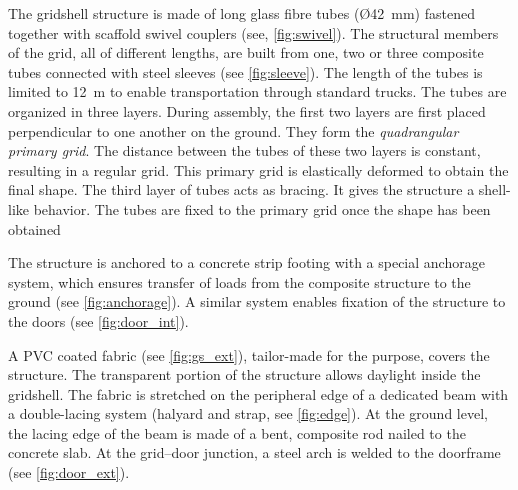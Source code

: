 The gridshell structure is made of long glass fibre tubes (\O 42~mm) fastened together with scaffold swivel couplers (see, \cref{fig:swivel}). The structural members of the grid, all of different lengths, are built  from one, two or three composite tubes connected with steel sleeves (see \cref{fig:sleeve}). The length of the tubes is limited to 12~m to enable transportation through standard trucks. The tubes are organized in three layers. During assembly, the first two layers are first placed perpendicular to one another on the ground. They form the \emph{quadrangular primary grid}. The distance between the tubes of these two layers is constant, resulting in a regular grid. This primary grid is elastically deformed to obtain the final shape. The third layer of tubes acts as bracing. It gives the structure a shell-like behavior. The tubes are fixed to the primary grid once the shape has been obtained

The structure is anchored to a concrete strip footing with a special anchorage system, which ensures transfer of loads from the composite structure to the ground (see \cref{fig:anchorage}). A similar system enables fixation of the structure to the doors (see \cref{fig:door_int}).

A PVC coated fabric (see \cref{fig:gs_ext}), tailor-made for the purpose, covers the structure. The transparent portion of the structure allows daylight inside the gridshell. The fabric is stretched on the peripheral edge of a dedicated beam with a double-lacing system (halyard and strap, see \cref{fig:edge}). At the ground level, the lacing edge of the beam is made of a bent, composite rod nailed to the concrete slab. At the grid–door junction, a steel arch is welded to the doorframe (see \cref{fig:door_ext}).

